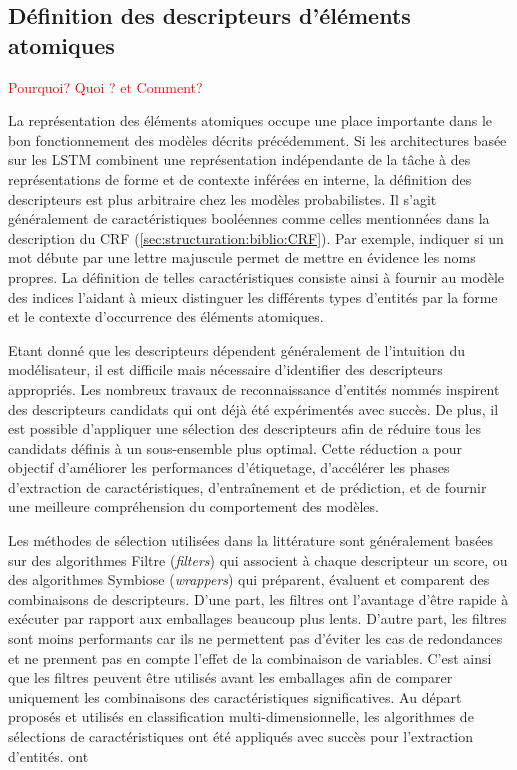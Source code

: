 \subsection{Définition des descripteurs d'éléments atomiques}
\textcolor{red}{Pourquoi? Quoi ? et Comment?}

La représentation des éléments atomiques occupe une place importante dans le bon fonctionnement des modèles décrits précédemment. Si les architectures basée sur les LSTM combinent une représentation indépendante de la tâche à des représentations de forme et de contexte inférées en interne, la définition des descripteurs est plus arbitraire chez les modèles probabilistes. Il s'agit généralement de caractéristiques booléennes comme celles mentionnées dans la description du CRF (\ref{sec:structuration:biblio:CRF}). Par exemple, indiquer si un mot débute par une lettre majuscule permet de mettre en évidence les noms propres. La définition de telles caractéristiques consiste ainsi à fournir au modèle des indices l'aidant à mieux distinguer les différents types d'entités par la forme et le contexte d'occurrence des éléments atomiques. 

Etant donné que les descripteurs dépendent généralement de l'intuition du modélisateur, il est difficile mais nécessaire d'identifier des descripteurs appropriés. Les nombreux travaux de reconnaissance d'entités nommés inspirent des descripteurs candidats qui ont déjà été expérimentés avec succès. De plus, il est possible d'appliquer une sélection des descripteurs afin de réduire tous les candidats définis à un sous-ensemble plus optimal. Cette réduction a pour objectif d'améliorer les performances d'étiquetage, d'accélérer les phases d'extraction de caractéristiques, d'entraînement et de prédiction, et de fournir une meilleure compréhension du comportement des modèles. 

Les méthodes de sélection utilisées dans la littérature sont généralement basées sur des algorithmes Filtre (\textit{filters}) qui associent à chaque descripteur un score, ou des algorithmes Symbiose (\textit{wrappers}) qui préparent, évaluent et comparent des combinaisons de descripteurs. D'une part, les filtres ont l'avantage d'être rapide à exécuter par rapport aux emballages beaucoup plus lents. D'autre part, les filtres sont moins performants car ils ne permettent pas d'éviter les cas de redondances et ne prennent pas en compte l'effet de la combinaison de variables. C'est ainsi que les filtres peuvent être utilisés avant les emballages afin de comparer uniquement les combinaisons des caractéristiques significatives. Au départ proposés et utilisés en classification multi-dimensionnelle, les algorithmes de sélections de caractéristiques ont été appliqués avec succès pour l'extraction d'entités. \citet{klinger2009FeaturefilterCRF} ont 

